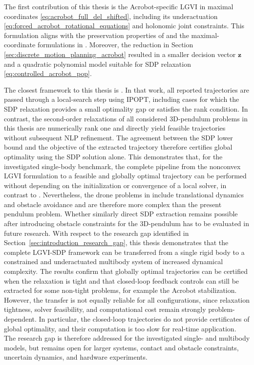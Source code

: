 The first contribution of this thesis is the Acrobot-specific LGVI in maximal coordinates
\eqref{eq:acrobot_full_del_shifted}, including its underactuation
\eqref{eq:forced_acrobot_rotational_equations} and holonomic joint constraints. This formulation aligns with
the preservation properties of
\cite{Marsden2001,Lee2008} and the maximal-coordinate formulations in
\cite{BrudigamManchester2021VariationalIntegrators,BrudigamManchester2021LQR}.
Moreover, the reduction in Section \ref{sec:discrete_motion_planning_acrobot}
resulted in a smaller decision vector $\bm{z}$ and a
quadratic polynomial model suitable for SDP relaxation \eqref{eq:controlled_acrobot_pop}.

The closest framework to this thesis is \cite{Sangli2025}. In that work, all reported 
trajectories are passed through a local-search step using IPOPT, including cases for which 
the SDP relaxation provides a small optimality gap or satisfies the rank condition. 
In contrast, the second-order relaxations of all considered 3D-pendulum problems in this 
thesis are numerically rank one and directly yield feasible trajectories without subsequent 
NLP refinement. The agreement between the SDP lower bound and the objective of the extracted 
trajectory therefore certifies global optimality using the SDP solution alone. This 
demonstrates that, for the investigated single-body benchmark, the complete pipeline from the 
nonconvex LGVI formulation to a feasible and globally optimal trajectory can be performed 
without depending on the initialization or convergence of a local solver, in contrast to \cite{Sangli2025}. 
Nevertheless, the drone problems in 
\cite{Sangli2025} include translational dynamics and obstacle avoidance and are therefore 
more complex than the present pendulum problem. Whether similarly direct SDP extraction 
remains possible after introducing obstacle constraints for the 3D-pendulum 
has to be evaluated in future research.
With respect to the research gap identified in Section~\ref{sec:introduction_research_gap}, this thesis 
demonstrates that the complete LGVI-SDP framework can be transferred from a single rigid body 
to a constrained and underactuated multibody system of increased dynamical complexity. 
The results confirm that globally optimal trajectories can be 
certified when the relaxation is tight and that closed-loop feedback controls can still be 
extracted for some non-tight problems, for example the Acrobot stabilization. 
However, the transfer is not equally reliable for 
all configurations, since relaxation tightness, solver feasibility, and computational cost 
remain strongly problem-dependent. In particular, the closed-loop trajectories do not 
provide certificates of global optimality, and their computation is 
too slow for real-time application. The research gap is therefore addressed for the 
investigated single- and multibody models, but remains open for larger systems, contact 
and obstacle constraints, uncertain dynamics, and hardware experiments.



